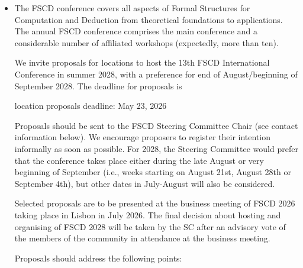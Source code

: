 \documentclass[prodmode,acmtecs]{acmsmall} %
\begin{document}
\begin{itemize}\item  The FSCD conference covers all aspects of Formal Structures for Computation and Deduction from theoretical foundations to applications. The annual FSCD conference comprises the main conference and a considerable number of affiliated workshops (expectedly, more than ten).  
 
  We invite proposals for locations to host the 13th FSCD International Conference in summer 2028, with a preference for end of August/beginning of September 2028. The deadline for proposals is  
 
location proposals deadline: May 23, 2026 
 
  Proposals should be sent to the FSCD Steering Committee Chair (see contact information below). We encourage proposers to register their intention informally as soon as possible. For 2028, the Steering Committee would prefer that the conference takes place either during the late August or very beginning of September (i.e., weeks starting on August 21st, August 28th or September 4th), but other dates in July-August will also be considered. 
 
  Selected proposals are to be presented at the business meeting of FSCD 2026 taking place in Lisbon in July 2026. The final decision about hosting and organising of FSCD 2028 will be taken by the SC after an advisory vote of the members of the community in attendance at the business meeting. 
 
  Proposals should address the following points: 
 

\end{itemize}
\end{document}
